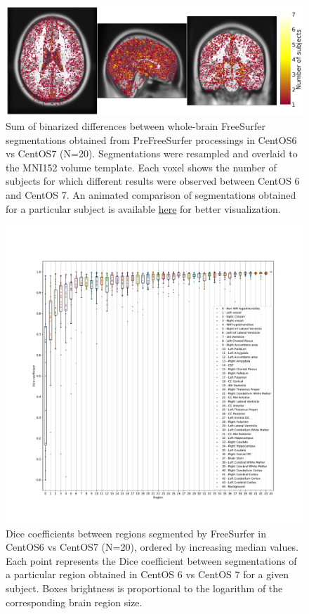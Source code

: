 \documentclass[a4paper,num-refs]{oup-contemporary}
\newcommand{\revised}[1]{\color{blue}#1\color{black}\xspace}
\begin{document}
\begin{figure}
\centering
  \includegraphics[width=\columnwidth]{figures/brain_segmentation_mni.png}
  \caption{Sum of binarized differences between whole-brain FreeSurfer
  segmentations obtained from PreFreeSurfer processings in CentOS6 vs CentOS7
   (N=20). Segmentations were resampled and overlaid to the MNI152 volume
  template.
  \revised{
  Each voxel shows the number of subjects for which different results were observed between CentOS 6 and CentOS 7.}
  An animated comparison of segmentations obtained for a particular subject is available
\href{https://github.com/big-data-lab-team/HCP-reproducibility-paper/blob/master/figures/fs_brain_segmentation.gif}
{here} for better visualization.}
  \label{fig:tissue_class}
\end{figure}

\begin{figure}
  \hspace*{-1cm}
  \includegraphics[width=1.1\linewidth]{figures/dice_regions.pdf}
    \caption{Dice coefficients between regions segmented by FreeSurfer in CentOS6 vs CentOS7 (N=20), ordered by increasing
    median values.
    \revised{Each point represents the Dice coefficient between segmentations of a particular region obtained in CentOS 6 vs CentOS 7 for a given subject.}
    Boxes brightness is proportional to the logarithm of the corresponding brain region size.}
    \label{fig:scatter_plot}
  \end{figure}
\end{document}
